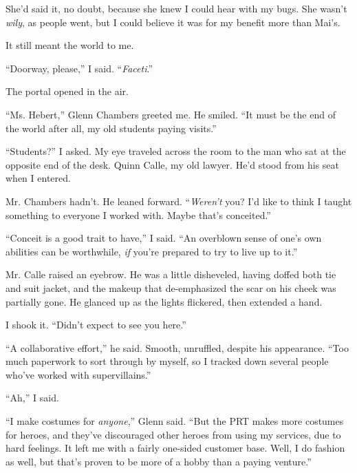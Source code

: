 She'd said it, no doubt, because she knew I could hear with my bugs.  She wasn't \emph{wily}, as people went, but I could believe it was for my benefit more than Mai's.



It still meant the world to me.



``Doorway, please,'' I said.  ``\emph{Faceti}.''



The portal opened in the air.



\sectionbreak



``Ms. Hebert,'' Glenn Chambers greeted me.  He smiled.  ``It must be the end of the world after all, my old students paying visits.''



``Students?'' I asked.  My eye traveled across the room to the man who sat at the opposite end of the desk.  Quinn Calle, my old lawyer.  He'd stood from his seat when I entered.



Mr. Chambers hadn't.  He leaned forward.  ``\emph{Weren't} you?  I'd like to think I taught something to everyone I worked with.  Maybe that's conceited.''



``Conceit is a good trait to have,'' I said.  ``An overblown sense of one's own abilities can be worthwhile, \emph{if} you're prepared to try to live up to it.''



Mr. Calle raised an eyebrow.  He was a little disheveled, having doffed both tie and suit jacket, and the makeup that de-emphasized the scar on his cheek was partially gone.  He glanced up as the lights flickered, then extended a hand.



I shook it.  ``Didn't expect to see you here.''



``A collaborative effort,'' he said.  Smooth, unruffled, despite his appearance.  ``Too much paperwork to sort through by myself, so I tracked down several people who've worked with supervillains.''



``Ah,'' I said.



``I make costumes for \emph{anyone},'' Glenn said.  ``But the PRT makes more costumes for heroes, and they've discouraged other heroes from using my services, due to hard feelings.  It left me with a fairly one-sided customer base.  Well, I do fashion as well, but that's proven to be more of a hobby than a paying venture.''



